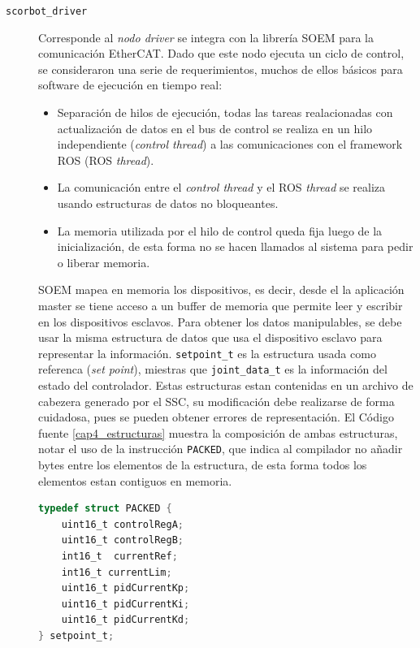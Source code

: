 \begin{description}

\item[\texttt{scorbot\_driver}] Corresponde al \textit{nodo driver} se integra con la librería SOEM \cite{soem} para la comunicación EtherCAT. Dado que este nodo ejecuta un ciclo de control, se consideraron una serie de requerimientos, muchos de ellos básicos para software de ejecución en tiempo real:

\begin{itemize}
\item Separación de hilos de ejecución, todas las tareas realacionadas con actualización de datos en el bus de control se realiza en un hilo independiente (\textit{control thread}) a las comunicaciones con el framework ROS (ROS \textit{thread}).
\item La comunicación entre el  \textit{control thread} y el ROS \textit{thread} se realiza usando estructuras de datos no bloqueantes.
\item La memoria utilizada por el hilo de control queda fija luego de la inicialización, de esta forma no se hacen llamados al sistema para pedir o liberar memoria.
\end{itemize}

SOEM mapea en memoria los dispositivos, es decir, desde el la aplicación master se tiene acceso a un buffer de memoria que permite leer y escribir en los dispositivos esclavos. Para obtener los datos manipulables, se debe usar la misma estructura de datos que usa el dispositivo esclavo para representar la información. \texttt{setpoint\_t} es la estructura usada como referenca (\textit{set point}), miestras que \texttt{joint\_data\_t} es la información del estado del controlador. Estas estructuras estan contenidas en un archivo de cabezera generado por el SSC, su modificación debe realizarse de forma cuidadosa, pues se pueden obtener errores de representación. El Código fuente \ref{cap4_estructuras} muestra la composición de ambas estructuras, notar el uso de la instrucción \texttt{PACKED}, que indica al compilador no añadir bytes entre los elementos de la estructura, de esta forma todos los elementos estan contiguos en memoria.

\begin{lstlisting}[language=C,style=csstyle, caption=Estructuras de datos usadas para mapear datos de dispositivos esclavos, label=cap4_estructuras]
typedef struct PACKED {
    uint16_t controlRegA;
    uint16_t controlRegB;
    int16_t  currentRef;
    int16_t currentLim;
    uint16_t pidCurrentKp;
    uint16_t pidCurrentKi;
    uint16_t pidCurrentKd;
} setpoint_t;


\end{lstlisting}
\end{description}
